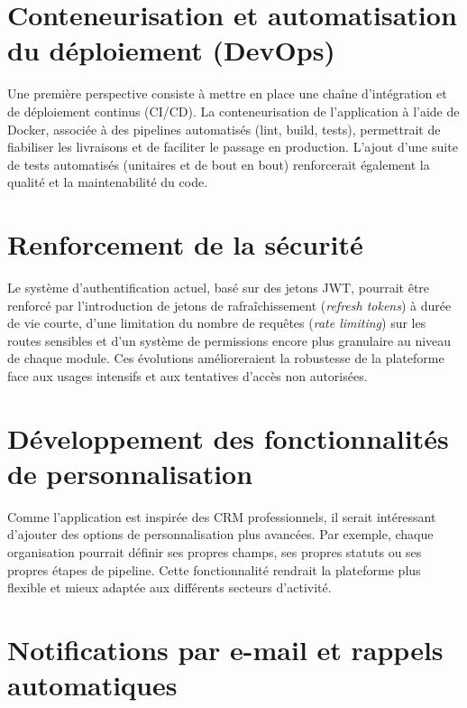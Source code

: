 \documentclass[12pt,a4paper,twoside,openany]{book}
\begin{document}
\section*{Conteneurisation et automatisation du déploiement (DevOps)}

Une première perspective consiste à mettre en place une chaîne d’intégration et de déploiement continus (CI/CD). La conteneurisation de l’application à l’aide de Docker, associée à des pipelines automatisés (lint, build, tests), permettrait de fiabiliser les livraisons et de faciliter le passage en production. L’ajout d’une suite de tests automatisés (unitaires et de bout en bout) renforcerait également la qualité et la maintenabilité du code.

\section*{Renforcement de la sécurité}

Le système d’authentification actuel, basé sur des jetons JWT, pourrait être renforcé par l’introduction de jetons de rafraîchissement (\textit{refresh tokens}) à durée de vie courte, d’une limitation du nombre de requêtes (\textit{rate limiting}) sur les routes sensibles et d’un système de permissions encore plus granulaire au niveau de chaque module. Ces évolutions amélioreraient la robustesse de la plateforme face aux usages intensifs et aux tentatives d’accès non autorisées.

\section*{Développement des fonctionnalités de personnalisation}

Comme l’application est inspirée des CRM professionnels, il serait intéressant d’ajouter des options de personnalisation plus avancées. Par exemple, chaque organisation pourrait définir ses propres champs, ses propres statuts ou ses propres étapes de pipeline. Cette fonctionnalité rendrait la plateforme plus flexible et mieux adaptée aux différents secteurs d’activité.

\section*{Notifications par e-mail et rappels automatiques}
\end{document}

